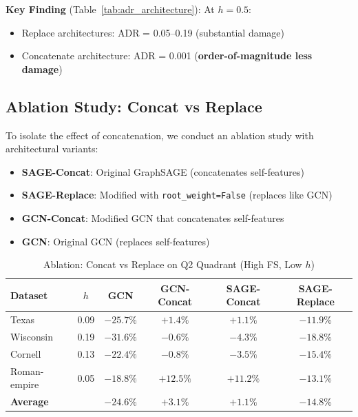 \textbf{Key Finding} (Table~\ref{tab:adr_architecture}): At $h = 0.5$:
\begin{itemize}
    \item Replace architectures: ADR = 0.05--0.19 (substantial damage)
    \item Concatenate architecture: ADR = 0.001 (\textbf{order-of-magnitude less damage})
\end{itemize}

\subsection{Ablation Study: Concat vs Replace}

To isolate the effect of concatenation, we conduct an ablation study with architectural variants:

\begin{itemize}
    \item \textbf{SAGE-Concat}: Original GraphSAGE (concatenates self-features)
    \item \textbf{SAGE-Replace}: Modified with \texttt{root\_weight=False} (replaces like GCN)
    \item \textbf{GCN-Concat}: Modified GCN that concatenates self-features
    \item \textbf{GCN}: Original GCN (replaces self-features)
\end{itemize}

\begin{table}[t]
\centering
\caption{Ablation: Concat vs Replace on Q2 Quadrant (High FS, Low $h$)}
\label{tab:concat_ablation}
\begin{tabular}{@{}lccccc@{}}
\toprule
\textbf{Dataset} & \textbf{$h$} & \textbf{GCN} & \textbf{GCN-Concat} & \textbf{SAGE-Concat} & \textbf{SAGE-Replace} \\
\midrule
Texas & 0.09 & $-25.7\%$ & $+1.4\%$ & $+1.1\%$ & $-11.9\%$ \\
Wisconsin & 0.19 & $-31.6\%$ & $-0.6\%$ & $-4.3\%$ & $-18.8\%$ \\
Cornell & 0.13 & $-22.4\%$ & $-0.8\%$ & $-3.5\%$ & $-15.4\%$ \\
Roman-empire & 0.05 & $-18.8\%$ & $+12.5\%$ & $+11.2\%$ & $-13.1\%$ \\
\midrule
\textbf{Average} & & $-24.6\%$ & $+3.1\%$ & $+1.1\%$ & $-14.8\%$ \\
\bottomrule
\end{tabular}
\end{table}

